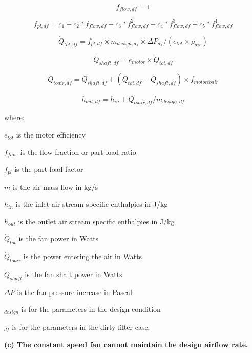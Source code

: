 \begin{equation}
f_{flow,df} = 1
\end{equation}

\begin{equation}
f_{pl,df} = c_{1} + c_{2}*f_{flow,df} + c_{3}*f_{flow,df}^2 + c_{4}*f_{flow,df}^3 + c_{5}*f_{flow,df}^4
\end{equation}

\begin{equation}
\dot{Q}_{tot,df} = f_{pl,df} \times m_{design,df} \times \Delta P_{df} / (e_{tot} \times \rho_{air} )
\end{equation}

\begin{equation}
\dot{Q}_{shaft,df} = e_{motor} \times \dot{Q}_{tot, df}
\end{equation}

\begin{equation}
\dot{Q}_{toair,df} = \dot{Q}_{shaft,df} +( \dot{Q}_{tot,df} - \dot{Q}_{shaft,df}) \times f_{motortoair}
\end{equation}

\begin{equation}
h_{out,df} = h_{in} + \dot{Q}_{toair,df} / m_{design,df}
\end{equation}

where:

\(e_{tot}\) is the motor efficiency

\(f_{flow}\) is the flow fraction or part-load ratio

\(f_{pl}\) is the part load factor

\(m\) is the air mass flow in kg/s

\(h_{in}\) is the inlet air stream specific enthalpies in J/kg

\(h_{out}\) is the outlet air stream specific enthalpies in J/kg

\(\dot{Q}_{tot}\) is the fan power in Watts

\(\dot{Q}_{toair}\) is the power entering the air in Watts

\(\dot{Q}_{shaft}\) is the fan shaft power in Watts

\(\Delta P\) is the fan pressure increase in Pascal

\(_{design}\) is for the parameters in the design condition

\(_{df}\) is for the parameters in the dirty filter case.

\textbf{(c) The constant speed fan cannot maintain the design airflow rate.}

